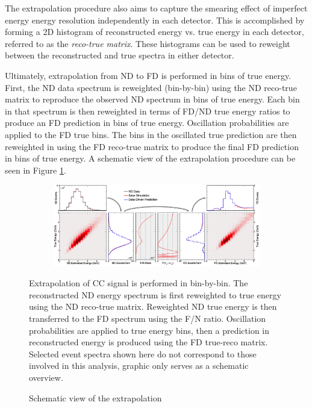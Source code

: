 The extrapolation procedure also aims to capture the smearing effect of
imperfect energy energy resolution independently in each detector.
This is accomplished by forming a 2D histogram of reconstructed energy
vs. true energy in each detector, referred to as the \textit{reco-true matrix}.
These histograms can be used to reweight between the reconstructed
and true spectra in either detector.

Ultimately, extrapolation from ND to FD is performed in bins of true energy.
First, the ND data spectrum is reweighted (bin-by-bin)
using the ND reco-true matrix
to reproduce the observed ND spectrum in bins of true energy.
Each bin in that spectrum is then reweighted in terms of FD/ND true energy
ratios to
produce an FD prediction in bins of true energy.
Oscillation probabilities are applied to the FD true bins.
The bins in the
oscillated true prediction are then reweighted in using the FD reco-true
matrix to produce the final FD prediction in bins of true energy.
A schematic view of the extrapolation procedure can be seen in Figure
\ref{extrap_fig}.

\begin{figure}
\begin{center}
  \begin{subfigure}[b]{\textwidth}
    \centering
    \includegraphics[height=0.45\textwidth, angle=-90]{figures/figures/extrap_schematic.png}
  \end{subfigure}
\end{center}
\caption{Schematic view of the extrapolation}{
Extrapolation of \numu CC signal is performed in bin-by-bin.
The reconstructed ND energy spectrum is first reweighted to true energy
using the ND reco-true matrix.
Reweighted ND true energy is then transferred to the FD spectrum using the
F/N ratio.
Oscillation probabilities are applied to true energy bins,
then a prediction in reconstructed energy is produced using the
FD true-reco matrix.
Selected event spectra shown here do not correspond to those
involved in this analysis, graphic only serves as a schematic overview.
}
\label{extrap_fig}
\end{figure}

